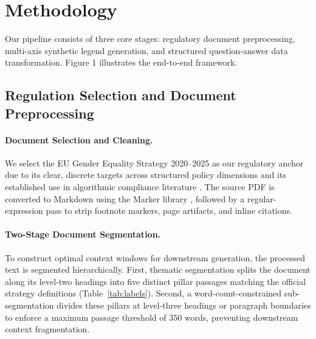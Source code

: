 \documentclass[pdflatex,sn-mathphys-num]{sn-jnl}%
\theoremstyle{thmstyleone}%
\theoremstyle{thmstyletwo}%
\theoremstyle{thmstylethree}%
\begin{document}
\section{Methodology}

Our pipeline consists of three core stages: regulatory document preprocessing,
multi-axis synthetic legend generation, and structured question-answer data
transformation. Figure 1 illustrates the end-to-end framework.

\subsection{Regulation Selection and Document Preprocessing}

\paragraph{Document Selection and Cleaning.} We select the EU Gender Equality
Strategy 2020--2025 \citep{europeancommission2020gender} as our regulatory
anchor due to its clear, discrete targets across structured policy dimensions
and its established use in algorithmic compliance literature
\citep{sargsyan2025compliance}. The source PDF is converted to Markdown using
the Marker library \citep{paruchuri2024marker}, followed by a regular-expression
pass to strip footnote markers, page artifacts, and inline citations.

\paragraph{Two-Stage Document Segmentation.} To construct optimal context
windows for downstream generation, the processed text is segmented
hierarchically. First, thematic segmentation splits the document along its
level-two headings into five distinct pillar passages matching the official
strategy definitions (Table~\ref{tab:labels}). Second, a word-count-constrained
sub-segmentation divides these pillars at level-three headings or paragraph
boundaries to enforce a maximum passage threshold of 350 words, preventing
downstream context fragmentation.
\end{document}
